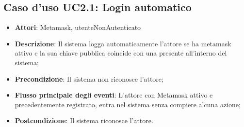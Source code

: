 \subsection{Caso d'uso \texorpdfstring{UC2.1}{UC2.1}: Login automatico}
\begin{itemize}
\item \textbf{Attori}: Metamask, utenteNonAutenticato
\item \textbf{Descrizione}: Il sistema logga automaticamente l'attore se ha metamask attivo e la sua chiave pubblica coincide con una presente all'interno del sistema;
\item \textbf{Precondizione}: Il sistema non riconosce l'attore;
\item \textbf{Flusso principale degli eventi}: L'attore con Metamask attivo e precedentemente registrato, entra nel sistema senza compiere alcuna azione;
\item \textbf{Postcondizione}: Il sistema riconosce l'attore.
\end{itemize}
